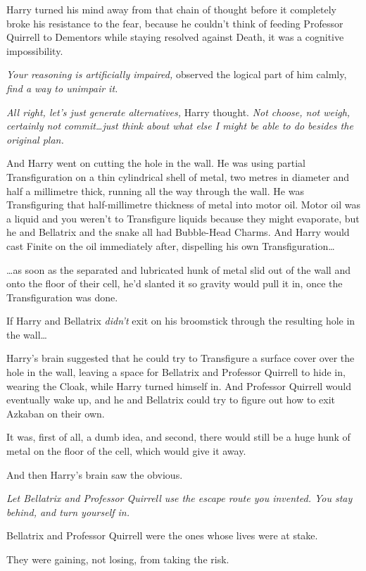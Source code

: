 Harry turned his mind away from that chain of thought before it completely
broke his resistance to the fear, because he couldn’t think of feeding
Professor Quirrell to Dementors while staying resolved against Death, it was a
cognitive impossibility.

\emph{Your reasoning is artificially impaired,} observed the logical part of
him calmly, \emph{find a way to unimpair it.}

\emph{All right, let’s just generate alternatives,} Harry thought. \emph{Not
choose, not weigh, certainly not commit…just think about what else I
might be able to do besides the original plan.}

And Harry went on cutting the hole in the wall. He was using partial
Transfiguration on a thin cylindrical shell of metal, two metres in diameter
and half a millimetre thick, running all the way through the wall. He was
Transfiguring that half-millimetre thickness of metal into motor oil. Motor oil
was a liquid and you weren’t to Transfigure liquids because they might
evaporate, but he and Bellatrix and the snake all had Bubble-Head Charms. And
Harry would cast Finite on the oil immediately after, dispelling his own
Transfiguration…

…as soon as the separated and lubricated hunk of metal slid out of the
wall and onto the floor of their cell, he’d slanted it so gravity would pull it
in, once the Transfiguration was done.

If Harry and Bellatrix \emph{didn’t} exit on his broomstick through the
resulting hole in the wall…

Harry’s brain suggested that he could try to Transfigure a surface cover over
the hole in the wall, leaving a space for Bellatrix and Professor Quirrell to
hide in, wearing the Cloak, while Harry turned himself in. And Professor
Quirrell would eventually wake up, and he and Bellatrix could try to figure out
how to exit Azkaban on their own.

It was, first of all, a dumb idea, and second, there would still be a huge hunk
of metal on the floor of the cell, which would give it away.

And then Harry’s brain saw the obvious.

\emph{Let Bellatrix and Professor Quirrell use the escape route you invented.
You stay behind, and turn yourself in.}

Bellatrix and Professor Quirrell were the ones whose lives were at stake.

They were gaining, not losing, from taking the risk.

